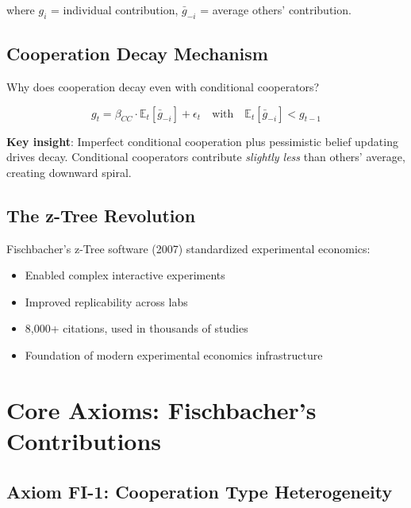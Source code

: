 where $g_i$ = individual contribution, $\bar{g}_{-i}$ = average others' contribution.

\subsection{Cooperation Decay Mechanism}

Why does cooperation decay even with conditional cooperators?

\begin{equation}
g_t = \beta_{CC} \cdot \mathbb{E}_t[\bar{g}_{-i}] + \epsilon_t \quad \text{with} \quad \mathbb{E}_t[\bar{g}_{-i}] < g_{t-1}
\end{equation}

\textbf{Key insight}: Imperfect conditional cooperation plus pessimistic belief updating drives decay. Conditional cooperators contribute \textit{slightly less} than others' average, creating downward spiral.

\subsection{The z-Tree Revolution}

Fischbacher's z-Tree software (2007) standardized experimental economics:

\begin{itemize}
    \item Enabled complex interactive experiments
    \item Improved replicability across labs
    \item 8,000+ citations, used in thousands of studies
    \item Foundation of modern experimental economics infrastructure
\end{itemize}

\section{Core Axioms: Fischbacher's Contributions}

\subsection{Axiom FI-1: Cooperation Type Heterogeneity}

